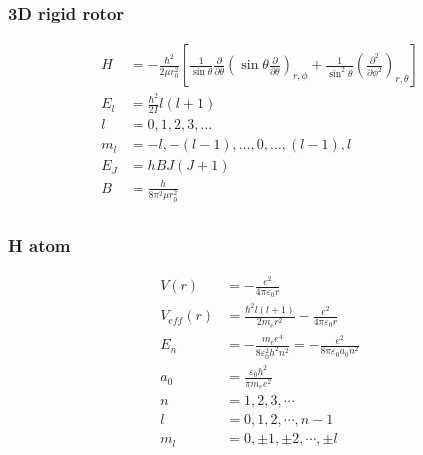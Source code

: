 \subsubsection{3D rigid rotor}
\begin{align*}
\hat{H}&=-\frac{\hbar^2}{2\mu r_0^2}\left[\frac{1}{\sin\theta}\frac{\partial}{\partial \theta}\left(\sin \theta \frac{\partial}{\partial \theta} \right)_{r,\phi} + \frac{1}{\sin^2\theta}\left(\frac{\partial^2}{\partial \phi^2} \right)_{r,\theta}\right]\\
E_l&=\frac{\hbar^2}{2I}l\left(l+1\right)\\
l&=0, 1, 2, 3, \ldots\\
m_l&=-l, -\left(l-1\right),\ldots,0,\ldots,\left(l-1\right),l\\
E_J&=hBJ\left(J+1\right)\\
B&=\frac{h}{8\pi^2\mu r_0^2}\\
\end{align*}

\subsubsection{H atom}
\begin{align*}
V\left(r\right)&=-\frac{e^2}{4\pi\varepsilon_0 r}\\
V_{eff}\left(r\right)&=\frac{\hbar^2 l\left(l+1\right)}{2m_er^2}-\frac{e^2}{4\pi\varepsilon_0 r}\\
E_n&=-\frac{m_ee^4}{8\varepsilon_0^2h^2n^2}=-\frac{e^2}{8\pi\varepsilon_0a_0n^2}\\
a_0&=\frac{\varepsilon_0h^2}{\pi m_ee^2}\\
n &= 1, 2, 3, \cdots\\
l&=0, 1, 2, \cdots, n-1\\
m_l&= 0, \pm1, \pm2, \cdots, \pm l\\
\end{align*}

